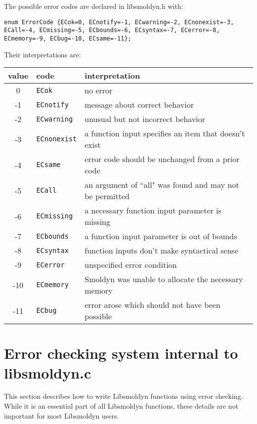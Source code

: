 \documentclass {book}
\begin{document}
The possible error codes are declared in libsmoldyn.h with:

\begin{lstlisting}
enum ErrorCode {ECok=0, ECnotify=-1, ECwarning=-2, ECnonexist=-3, ECall=-4, ECmissing=-5, ECbounds=-6, ECsyntax=-7, ECerror=-8, ECmemory=-9, ECbug=-10, ECsame=-11};
\end{lstlisting}

Their interpretations are:

\begin{longtable}[c]{cll}
value & code & interpretation\\
\hline
0 & \texttt{ECok} & no error\\
-1 & \texttt{ECnotify} & message about correct behavior\\
-2 & \texttt{ECwarning} & unusual but not incorrect behavior\\
-3 & \texttt{ECnonexist} & a function input specifies an item that doesn't exist\\
-4 & \texttt{ECsame} & error code should be unchanged from a prior code\\
-5 & \texttt{ECall} & an argument of ``all" was found and may not be permitted\\
-6 & \texttt{ECmissing} & a necessary function input parameter is missing\\
-7 & \texttt{ECbounds} & a function input parameter is out of bounds\\
-8 & \texttt{ECsyntax} & function inputs don't make syntactical sense\\
-9 & \texttt{ECerror} & unspecified error condition\\
-10 & \texttt{ECmemory} & Smoldyn was unable to allocate the necessary memory\\
-11 & \texttt{ECbug} & error arose which should not have been possible\\

\end{longtable}

\section{Error checking system internal to libsmoldyn.c}

This section describes how to write Libsmoldyn functions using error checking. While it is an essential part of all Libsmoldyn functions, these details are not important for most Libsmoldyn users.
\end{document}
